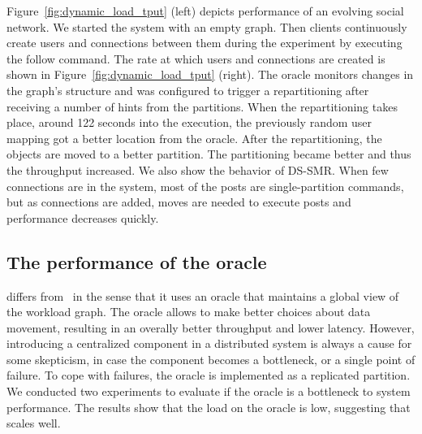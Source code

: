 Figure~\ref{fig:dynamic_load_tput} (left) depicts performance of an evolving social network.  
We started the system with an empty graph. Then clients
continuously create users and connections between them during the experiment
by executing the follow command.
The rate at which users and connections are created is shown in Figure~\ref{fig:dynamic_load_tput} (right).
The oracle monitors changes in the
graph's structure and was configured to trigger a repartitioning after receiving a number of hints
from the partitions.
When the repartitioning takes place, around 122 seconds into the execution, the previously random user mapping got a better location from the oracle.
After the repartitioning, the objects are moved to a better partition.
The partitioning became better and thus the throughput increased.
We also show the behavior of DS-SMR.
When few connections are in the system, most of the posts are single-partition commands, but as connections are added, moves are needed to execute posts and performance decreases quickly.


\subsection{The performance of the oracle}

\dynastar differs from \dssmr\ in the sense that it uses an oracle
that maintains a global view of the workload graph. The oracle allows
\dynastar to make better choices about data movement, resulting in an overally
better throughput and lower latency. However, introducing a centralized
component in a distributed system is always a cause for some skepticism,
in case the component becomes a bottleneck, or a single point of failure. 
To cope with failures, the oracle is implemented as a replicated partition. 
We conducted two experiments to evaluate if the \dynastar oracle is a bottleneck to
system performance. The results show that the load on the oracle is
low, suggesting that \dynastar scales well.


